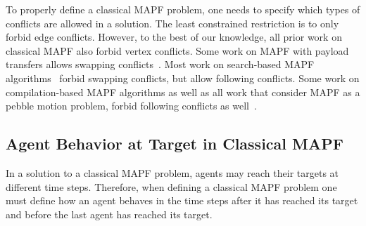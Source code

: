 \documentclass[letterpaper]{article} %
\newcommand{\comment}[1]{{\nb{\textbf{Comment:}}{orange}{#1}}}
\begin{document}
To properly define a classical MAPF problem, one needs to specify which types of conflicts are allowed in a solution. 
The least constrained restriction is to only forbid edge conflicts. 
However, to the best of our knowledge, 
all prior work on classical MAPF also forbid vertex conflicts. Some work on MAPF with payload transfers allows swapping conflicts~\cite{MaAAAI16}.
Most work on search-based MAPF algorithms~\cite{standley2010finding,felner2017search} forbid swapping conflicts, but allow following conflicts.
Some work on compilation-based MAPF algorithms 
as well as all work that consider MAPF as a pebble motion problem, forbid following conflicts as well~\cite{surynek2016empirical,bartak2017modeling}. 



\subsection{Agent Behavior at Target in Classical MAPF}

In a solution to a classical MAPF problem, 
agents may reach their targets at different time steps.
Therefore, when defining a classical MAPF problem one must define 
how an agent behaves in the time steps after it has reached its target and before the last agent has reached its target. 
\end{document}
